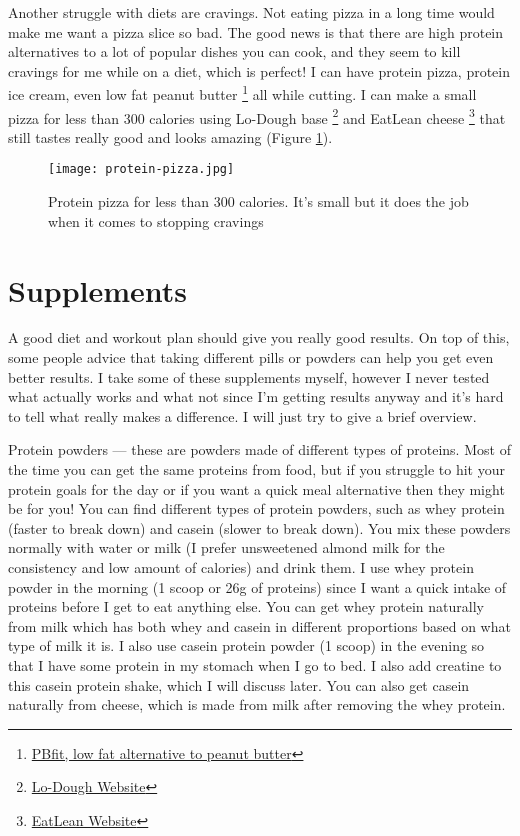 \documentclass[openany, 12pt]{book}
\begin{document}
        Another struggle with diets are cravings. Not eating pizza in a long time would make me want a pizza slice so bad. The good news is that there are high protein
        alternatives to a lot of popular dishes you can cook, and they seem to kill cravings for me while on a diet, which is perfect! I can have protein pizza, protein
        ice cream, even low fat peanut butter
        \footnote{\href{https://pbfit.com/}{PBfit, low fat alternative to peanut butter}} all while cutting. I can make a small pizza for less than 300 calories using Lo-Dough base
        \footnote{\href{https://lodough.co/}{Lo-Dough Website}} and EatLean cheese
        \footnote{\href{https://eatlean.com/}{EatLean Website}} that still tastes really
        good and looks amazing (Figure \ref{fig6}).

	\begin{figure}[h]
		\centering
		\texttt{[image: protein-pizza.jpg]}
		\caption{Protein pizza for less than 300 calories. It's small but it does the job when it comes to stopping cravings}
		\label{fig6}
	\end{figure}

        \section{Supplements}

        A good diet and workout plan should give you really good results. On top of this, some people advice that taking different pills or powders can help you get even better results.
        I take some of these supplements myself, however I never tested what actually works and what not since I'm getting results anyway and it's hard to tell what really makes a difference.
        I will just try to give a brief overview.

        Protein powders --- these are powders made of different types of proteins. Most of the time you can get the same proteins from food, but if you struggle to hit your protein goals for
        the day or if you want a quick meal alternative then they might be for you! You can find different types of protein powders, such as whey protein (faster to break down) and casein
        (slower to break down). You mix these powders normally with water or milk (I prefer unsweetened almond milk for the consistency and low amount of calories) and drink them.
        I use whey protein powder in the morning (1 scoop or 26g of proteins) since I want a quick intake of proteins before I get to eat anything else. You can get whey protein naturally
        from milk which has both whey and casein in different proportions based on what type of milk it is. I also use casein protein powder (1 scoop)
        in the evening so that I have some protein in my stomach when I go to bed. I also add creatine to this casein protein shake, which I will discuss later. You can also get casein naturally
        from cheese, which is made from milk after removing the whey protein.
\end{document}
